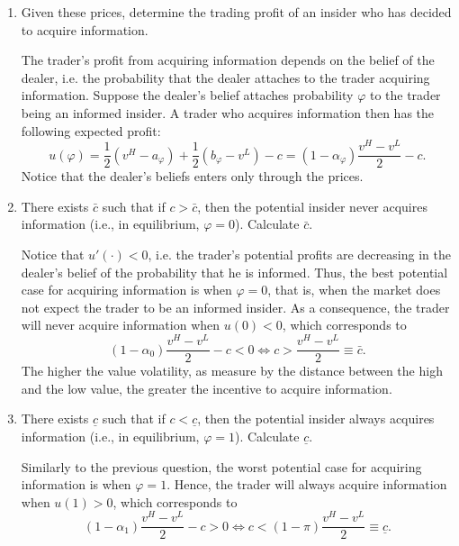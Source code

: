 \documentclass[11pt
, answers
]{exam}
\begin{document}
\begin{enumerate} [label=(\alph*). ]
\item Given these prices, determine the trading profit of an insider who has decided to acquire information.

\begin{solution}
	The trader's profit from acquiring information depends on the belief of the dealer, i.e. the probability that the dealer attaches to the trader acquiring information. Suppose the dealer's belief attaches probability $\varphi$ to the trader being an informed insider. A trader who acquires information then has the following expected profit:
	\[
	u(\varphi) = \frac{1}{2}(v^H - a_\varphi) + \frac{1}{2}(b_\varphi - v^L) - c = (1-\alpha_\varphi) \frac{v^H-v^L}{2}-c.
	\]
	Notice that the dealer's beliefs enters only through the prices.
\end{solution}


\item There exists $\bar{c}$ such that if $c > \bar{c}$, then the potential insider never acquires information (i.e., in equilibrium, $\varphi=0$). Calculate $\bar{c}$.

\begin{solution}
	Notice that $u'(\cdot)<0$, i.e. the trader's potential profits are decreasing in the dealer's belief of the probability that he is informed. Thus, the best potential case for acquiring information is when $\varphi=0$, that is, when the market does not expect the trader to be an informed insider. As a consequence, the trader will never acquire information when $u(0) < 0$, which corresponds to
	\[
	(1-\alpha_0)\frac{v^H-v^L}{2}-c <0 \Leftrightarrow c > \frac{v^H-v^L}{2} \equiv \bar{c}.
	\]
	The higher the value volatility, as measure by the distance between the high and the low value, the greater the incentive to acquire information.
\end{solution}


\item There exists $\underline{c}$ such that if $c < \underline{c}$, then the potential insider always acquires information (i.e., in equilibrium, $\varphi=1$). Calculate $\underline{c}$.

\begin{solution}
	Similarly to the previous question, the worst potential case for acquiring information is when $\varphi=1$. Hence, the trader will always acquire information when $u(1) > 0$, which corresponds to
	\[
	(1-\alpha_1)\frac{v^H-v^L}{2}-c > 0 \Leftrightarrow c < (1-\pi) \frac{v^H-v^L}{2} \equiv \underline{c}.
	\]
\end{solution}



\end{enumerate}
\end{document}
